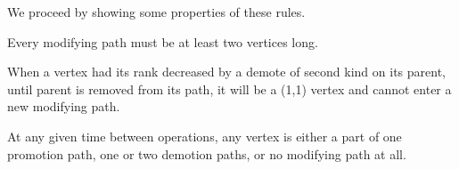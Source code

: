 We proceed by showing some properties of these rules.

\begin{obs}
Every modifying path must be at least two vertices long.
\end{obs}

\begin{obs}
When a vertex had its rank decreased by a demote of second kind on its parent, until parent is removed from its path, it will be a (1,1) vertex and cannot enter a new modifying path. 
\end{obs}

\begin{prop}
At any given time between operations, any vertex is either a part of one promotion path, one or two demotion paths, or no modifying path at all.
\label{thm-constant-paths}
\end{prop}

